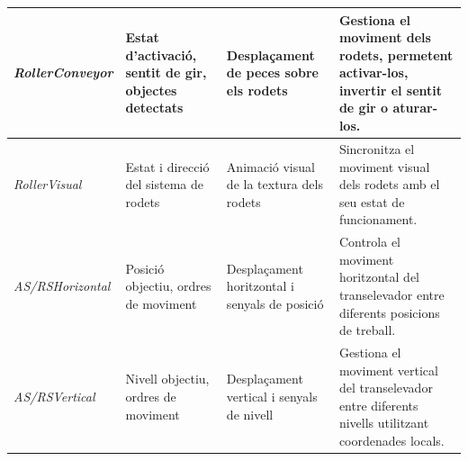 \documentclass[a4paper,11pt,DIV=13,headings=normal,abstract=true,twoside=semi]{article}
\begin{document}
\begin{table}[H]
\begin{tabularx}{\textwidth}{|p{2.5cm}|p{3.4cm}|p{3.2cm}|X|}
\emph{RollerConveyor}
& Estat d'activació, sentit de gir, objectes detectats
& Desplaçament de peces sobre els rodets
& Gestiona el moviment dels rodets, permetent activar-los, invertir el sentit de gir o aturar-los. \\
\hline

\emph{RollerVisual}
& Estat i direcció del sistema de rodets
& Animació visual de la textura dels rodets
& Sincronitza el moviment visual dels rodets amb el seu estat de funcionament. \\
\hline

\emph{AS/RSHorizontal}
& Posició objectiu, ordres de moviment
& Desplaçament horitzontal i senyals de posició
& Controla el moviment horitzontal del transelevador entre diferents posicions de treball. \\
\hline

\emph{AS/RSVertical}
& Nivell objectiu, ordres de moviment
& Desplaçament vertical i senyals de nivell
& Gestiona el moviment vertical del transelevador entre diferents nivells utilitzant coordenades locals. \\
\hline

\end{tabularx}
\end{table}
\end{document}
